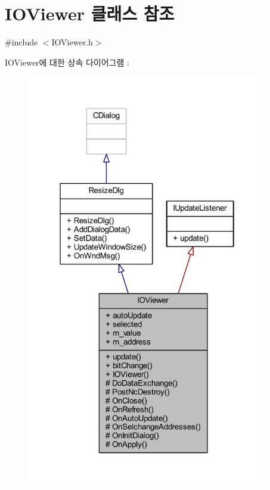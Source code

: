 \hypertarget{class_i_o_viewer}{}\section{I\+O\+Viewer 클래스 참조}
\label{class_i_o_viewer}


{\ttfamily \#include $<$I\+O\+Viewer.\+h$>$}



I\+O\+Viewer에 대한 상속 다이어그램 \+: \nopagebreak
\begin{figure}[H]
\begin{center}
\leavevmode
\includegraphics[width=298pt]{class_i_o_viewer__inherit__graph}
\end{center}
\end{figure}



